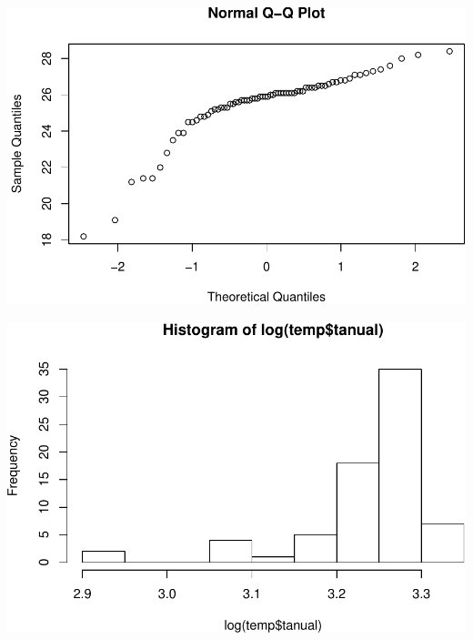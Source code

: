 \documentclass[11pt,]{article}
\newenvironment{Shaded}{\begin{snugshade}}{\end{snugshade}}
\newcommand{\KeywordTok}[1]{\textcolor[rgb]{0.13,0.29,0.53}{\textbf{#1}}}
\newcommand{\OperatorTok}[1]{\textcolor[rgb]{0.81,0.36,0.00}{\textbf{#1}}}
\newcommand{\NormalTok}[1]{#1}
\begin{document}
\begin{Shaded}
\end{Shaded}

\includegraphics[width=600px]{proyecto_files/figure-latex/esda-temp-2}

\begin{Shaded}
\end{Shaded}

\includegraphics[width=600px]{proyecto_files/figure-latex/esda-temp-3}
\end{document}
